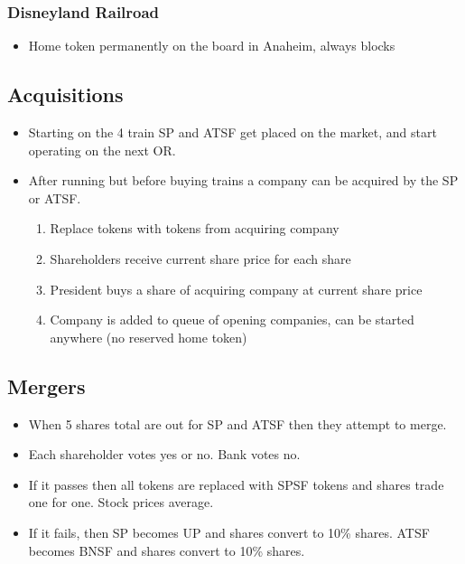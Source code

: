 \documentclass[letterpaper]{article}
\begin{document}
\begin{multicols}{2}
  \subsubsection*{Disneyland Railroad}
  \begin{itemize}
  \item Home token permanently on the board in Anaheim, always blocks
  \end{itemize}

  \subsection*{Acquisitions}

  \begin{itemize}
  \item Starting on the 4 train SP and ATSF get placed on the market, and
    start operating on the next OR.
  \item After running but before buying trains a company can be acquired by
    the SP or ATSF.
    \begin{enumerate}
    \item Replace tokens with tokens from acquiring company
    \item Shareholders receive current share price for each share
    \item President buys a share of acquiring company at current share price
    \item Company is added to queue of opening companies, can be started
      anywhere (no reserved home token)
    \end{enumerate}
  \end{itemize}

  \subsection*{Mergers}

  \begin{itemize}
  \item When 5 shares total are out for SP and ATSF then they attempt to merge.
  \item Each shareholder votes yes or no. Bank votes no.
  \item If it passes then all tokens are replaced with SPSF tokens and shares
    trade one for one. Stock prices average.
  \item If it fails, then SP becomes UP and shares convert to 10\%
    shares. ATSF becomes BNSF and shares convert to 10\% shares.
  \end{itemize}
\end{multicols}
\end{document}
